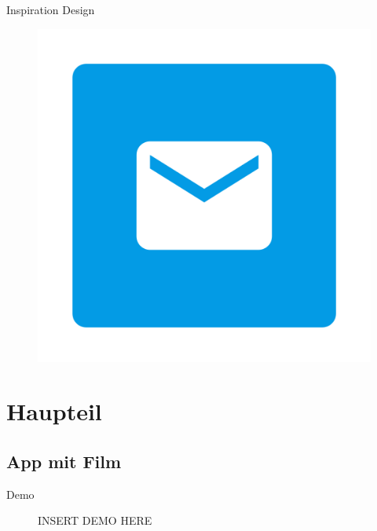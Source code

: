 \documentclass[aspectratio=169]{beamer}
\begin{document}
\begin{frame}[plain]{Inspiration Design}
\begin{varwidth}{.3\textwidth}
\begin{figure}
        \end{figure}
    \end{varwidth}
    \hfill
    \begin{varwidth}{.3\textwidth}\pause
        \begin{figure}
        \centering
        \includegraphics[width=.9\textwidth]{media/fairmail-logo.png}
        \end{figure}
\end{varwidth}
\end{frame}

\section{Haupteil}
\subsection{App mit Film}
\begin{frame}[plain]{Demo}
    \begin{figure}[h]
        \centering
        INSERT DEMO HERE
    \end{figure}
\end{frame}
\end{document}

